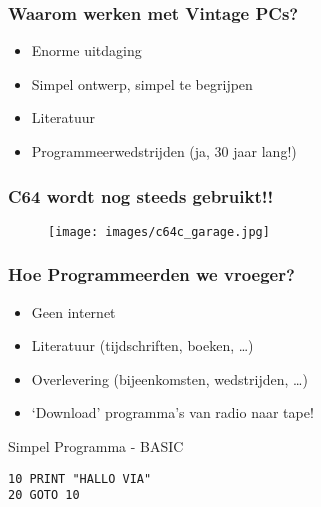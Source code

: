 \documentclass[aspectratio=43]{uva-inf-presentation}
\begin{document}

\begin{frame}
\frametitle{Waarom werken met Vintage PCs?}

\begin{itemize}
\item Enorme uitdaging
\item Simpel ontwerp, simpel te begrijpen
\item Literatuur
\item Programmeerwedstrijden (ja, 30 jaar lang!)
\end{itemize}

\end{frame}


\begin{frame}
\frametitle{C64 wordt nog steeds gebruikt!!}

\begin{figure}
\texttt{[image: images/c64c\_garage.jpg]}
\end{figure}

\end{frame}


\begin{frame}
\frametitle{Hoe Programmeerden we vroeger?}

\begin{itemize}
\item Geen internet
\item Literatuur (tijdschriften, boeken, \dots)
\item Overlevering (bijeenkomsten, wedstrijden, \dots)
\item `Download' programma's van radio naar tape!
\end{itemize}

\end{frame}


\begin{frame}[fragile]{Simpel Programma - BASIC}

\begin{lstlisting}
10 PRINT "HALLO VIA"
20 GOTO 10
\end{lstlisting}

\end{frame}
\end{document}
